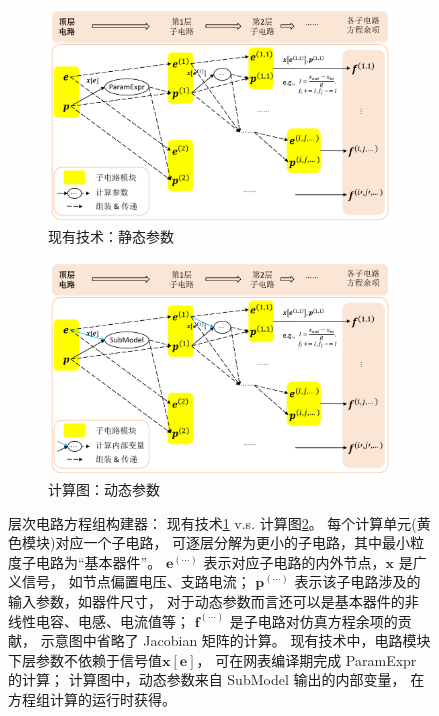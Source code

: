 \begin{figure}[htpb]
  \centering
  \begin{subfigure}{0.49\textwidth}
    \includegraphics[width=\textwidth]{fig/static-engine.pdf}
    \caption{现有技术：静态参数}
    \label{fig:static-engine}
  \end{subfigure}
  \begin{subfigure}{0.49\textwidth}
    \includegraphics[width=\textwidth]{fig/computational-graph.pdf}
    \caption{计算图：动态参数}
    \label{fig:computational-graph}
  \end{subfigure}
  \caption{层次电路方程组构建器：
  现有技术\ref{fig:static-engine} v.s. 计算图\ref{fig:computational-graph}。
  每个计算单元({\color{yellow}黄色模块})对应一个子电路，
  可逐层分解为更小的子电路，其中最小粒度子电路为“基本器件”。
  $\bm{e}^{(\cdots)}$ 表示对应子电路的内外节点，$\bm{x}$ 是广义信号，
  如节点偏置电压、支路电流；
  $\bm{p}^{(\cdots)}$ 表示该子电路涉及的输入参数，如器件尺寸，
  对于动态参数而言还可以是基本器件的非线性电容、电感、电流值等；
  $\bm{f}^{(\cdots)}$ 是子电路对仿真方程余项的贡献，
  示意图中省略了 Jacobian 矩阵的计算。
  现有技术中，电路模块下层参数不依赖于信号值$\bm{x}[\bm{e}]$，
  可在网表编译期完成 ParamExpr 的计算；
  计算图中，动态参数来自 SubModel 输出的{\color{capri}内部变量}，
  在方程组计算的运行时获得。
  }
  \label{fig:equations-system-constructor}
\end{figure}
